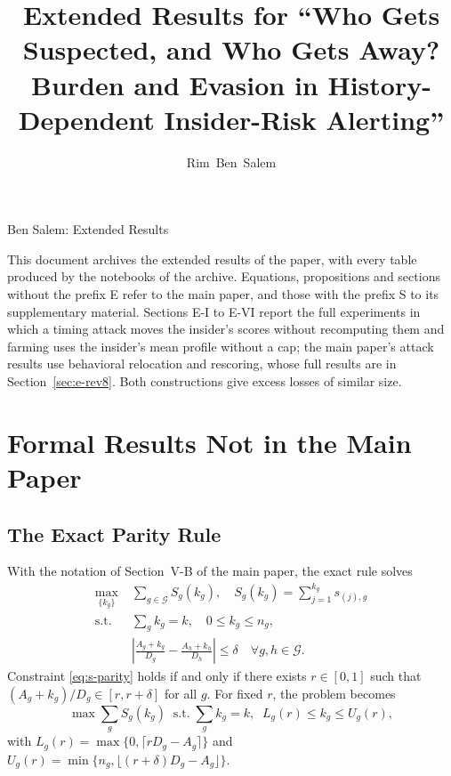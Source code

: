 \documentclass[10pt,onecolumn,letterpaper]{article}
\newcommand{\G}{\mathcal{G}}
\begin{document}
\title{Extended Results for ``Who Gets Suspected, and Who Gets Away? Burden and Evasion in History-Dependent Insider-Risk Alerting''}

\author{Rim~Ben~Salem}

%
{Ben Salem: Extended Results}

\maketitle

\renewcommand{\thesection}{E-\Roman{section}}
\renewcommand{\thetable}{E\arabic{table}}
\renewcommand{\thefigure}{E\arabic{figure}}
\renewcommand{\thealgorithm}{E\arabic{algorithm}}
\renewcommand{\theproposition}{E\arabic{proposition}}
\renewcommand{\thelemma}{S\arabic{lemma}}
\renewcommand{\theequation}{E\arabic{equation}}

This document archives the extended results of the paper, with every table produced by the notebooks of the archive. Equations, propositions and sections without the prefix E refer to the main paper, and those with the prefix S to its supplementary material. Sections E-I to E-VI report the full experiments in which a timing attack moves the insider's scores without recomputing them and farming uses the insider's mean profile without a cap; the main paper's attack results use behavioral relocation and rescoring, whose full results are in Section~\ref{sec:e-rev8}. Both constructions give excess losses of similar size.

\section{Formal Results Not in the Main Paper}
\label{sec:s-proof}

\subsection{The Exact Parity Rule}
With the notation of Section~V-B of the main paper, the exact rule solves
\begin{align}
\max_{\{k_g\}}\;& \sum_{g\in\G} S_g(k_g),\quad S_g(k_g)=\sum_{j=1}^{k_g}s_{(j),g} \label{eq:s-obj}\\
\text{s.t.}\;& \sum_{g}k_g=k,\quad 0\le k_g\le n_g, \label{eq:s-budget}\\
& \left|\frac{A_g+k_g}{D_g}-\frac{A_h+k_h}{D_h}\right|\le\delta\quad\forall g,h\in\G. \label{eq:s-parity}
\end{align}
Constraint \eqref{eq:s-parity} holds if and only if there exists $r\in[0,1]$ such that $(A_g+k_g)/D_g\in[r,r+\delta]$ for all $g$. For fixed $r$, the problem becomes
\begin{equation}
\max\sum_g S_g(k_g)\;\;\text{s.t.}\;\sum_g k_g=k,\;\; L_g(r)\le k_g\le U_g(r),
\label{eq:s-fixedr}
\end{equation}
with $L_g(r)=\max\{0,\lceil rD_g-A_g\rceil\}$ and $U_g(r)=\min\{n_g,\lfloor (r+\delta)D_g-A_g\rfloor\}$.
\end{document}
